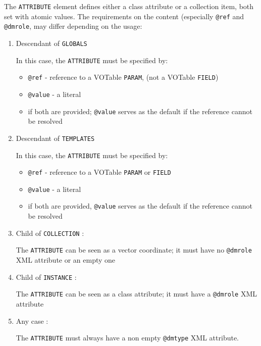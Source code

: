 
The \texttt{ATTRIBUTE} element defines either a class attribute or a collection item, both set with atomic values.
The requirements on
the content (especially \texttt{@ref} and  \texttt{@dmrole}, may differ depending on
the usage:


\begin{enumerate}
\item Descendant of \texttt{GLOBALS}

In this case, the \texttt{ATTRIBUTE} must be specified by:
  \begin{itemize} 
      \item \texttt{@ref} - reference to a VOTable \texttt{PARAM}, 
      (not a VOTable \texttt{FIELD})
      \item \texttt{@value} - a literal
      \item  if both are provided; \texttt{@value} serves as the default 
      if the reference cannot be resolved
  \end{itemize}  

  
\item Descendant of \texttt{TEMPLATES} 

In this case, the \texttt{ATTRIBUTE} must be specified by:
  \begin{itemize} 
      \item \texttt{@ref} - reference to a VOTable \texttt{PARAM} 
      or \texttt{FIELD}
      \item \texttt{@value} - a literal
      \item if both are provided, \texttt{@value} serves as the default if 
      the reference cannot be resolved
  \end{itemize}  

\item Child of \texttt{COLLECTION} :

    The \texttt{ATTRIBUTE} can be seen as a vector coordinate;  
    it must have  no \texttt{@dmrole} XML attribute or an empty one
    
\item Child of \texttt{INSTANCE} :

    The \texttt{ATTRIBUTE} can be seen as a class attribute;
    it must have a \texttt{@dmrole} XML attribute
           
\item Any case :

    The \texttt{ATTRIBUTE} must always have a non empty \texttt{@dmtype} XML attribute.
\end{enumerate}  
    
